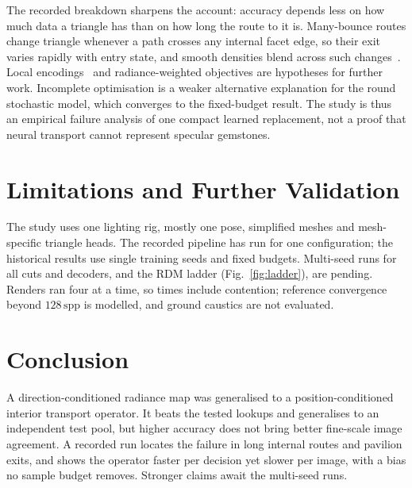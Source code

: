\documentclass[conference]{IEEEtran}
\newcommand{\spp}{\,\mathrm{spp}}
\begin{document}
The recorded breakdown sharpens the account: accuracy depends less on how much
data a triangle has than on how long the route to it is. Many-bounce routes
change triangle whenever a path crosses any internal facet edge, so their exit
varies rapidly with entry state, and smooth densities blend across such
changes~\cite{rahaman2019}. Local encodings~\cite{muller2022ngp} and
radiance-weighted objectives are hypotheses for further work. Incomplete optimisation is a weaker alternative explanation for the
round stochastic model, which converges to the fixed-budget result. The study is
thus an empirical failure analysis of one compact learned replacement, not a
proof that neural transport cannot represent specular gemstones.

\section{Limitations and Further Validation}
\label{sec:limits}
The study uses one lighting rig, mostly one pose, simplified meshes and
mesh-specific triangle heads. The recorded pipeline has run for one
configuration; the historical results use single training seeds and fixed
budgets. Multi-seed runs for all cuts and decoders, and the RDM ladder
(Fig.~\ref{fig:ladder}), are pending. Renders ran four at a time, so times
include contention; reference convergence beyond $128\spp$ is modelled, and
ground caustics are not evaluated.

\section{Conclusion}
A direction-conditioned radiance map was generalised to a position-conditioned
interior transport operator. It beats the tested lookups and generalises to an
independent test pool, but higher accuracy does not bring better fine-scale
image agreement. A recorded run locates the failure in long internal routes and
pavilion exits, and shows the operator faster per decision yet slower per image,
with a bias no sample budget removes. Stronger claims await the multi-seed runs.
\end{document}
